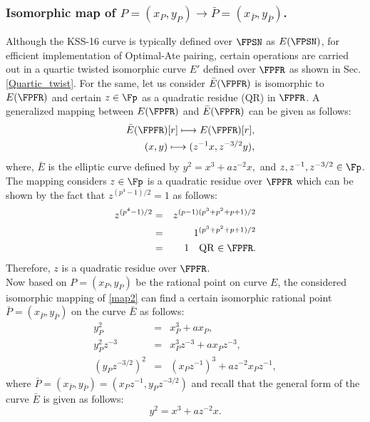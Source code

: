 \subsubsection{Isomorphic map of $P=(x_P,y_P) \to \bar P=(x_{\bar P},y_{\bar P})$.}
Although the KSS-16 curve is typically defined over $\FPSN$ as $E(\FPSN)$, for efficient implementation of Optimal-Ate pairing, certain operations are carried out in a quartic twisted isomorphic curve $E'$ defined over $\FPFR$ as shown in Sec. \ref{Quartic_twist}. 
For the same, let us consider $\bar{E}(\FPFR)$ is isomorphic to $E(\FPFR)$ and certain $z \in \Fp$ as a quadratic residue (QR) in $\FPFR$. 
A generalized mapping between $E(\FPFR)$ and $\bar{E}(\FPFR)$ can be given as follows:
\begin{eqnarray}
&&\bar{E}(\FPFR)[r]\longmapsto E(\FPFR)[r],\nonumber\\
&&(x,y)\longmapsto (z^{-1}x,z^{-3/2}y),\label{map2}\nonumber
\end{eqnarray}
where,  $\bar{E}$ is the elliptic curve defined by  $ y^2=x^3+az^{-2}x,$ and $z, z^{-1},z^{-3/2}\in \Fp$.\\
The mapping considers $z \in \Fp$ is a quadratic residue over $\FPFR$ which can be shown by the fact that $z^{(p^4-1)/2} = 1$ as follows:
\begin{eqnarray}
z^{(p^4-1)/2}& = &z^{(p-1)(p^3+p^2+p+1)/2 } \nonumber \\
& = &1^{(p^3+p^2+p+1)/2 } \nonumber \\
& = & 1 \quad \text{QR $\in \FPFR$}.
\end{eqnarray}
Therefore, $z$ is a quadratic residue over $\FPFR$.\\
Now  based on $P= (x_P, y_P)$ be the rational point on curve $E$, the considered isomorphic mapping of \eqref{map2}  can find a certain isomorphic rational point $\bar P = (x_{\bar P}, y_{\bar P})$ on the curve $\bar E$ as follows:
\begin{eqnarray}\label{bar_P}
y_P^2 & = & x_P^3+ax_P, \nonumber \\
y_P^2 z^{-3}& = & x_P^3 z^{-3} +ax_Pz^{-3}, \nonumber \\
(y_P z^{-3/2})^2& = & (x_Pz^{-1})^3 +az^{-2} x_Pz^{-1},
\end{eqnarray}
where $\bar P = (x_{\bar P}, y_{\bar P}) = (x_P z^{-1},y_P z^{-3/2})$ and recall that the general form of the curve $\bar E$ is given as follows:
\begin{equation}\label{isomorphic_E_bar}
y^2 = x^3+az^{-2}x.
\end{equation}
